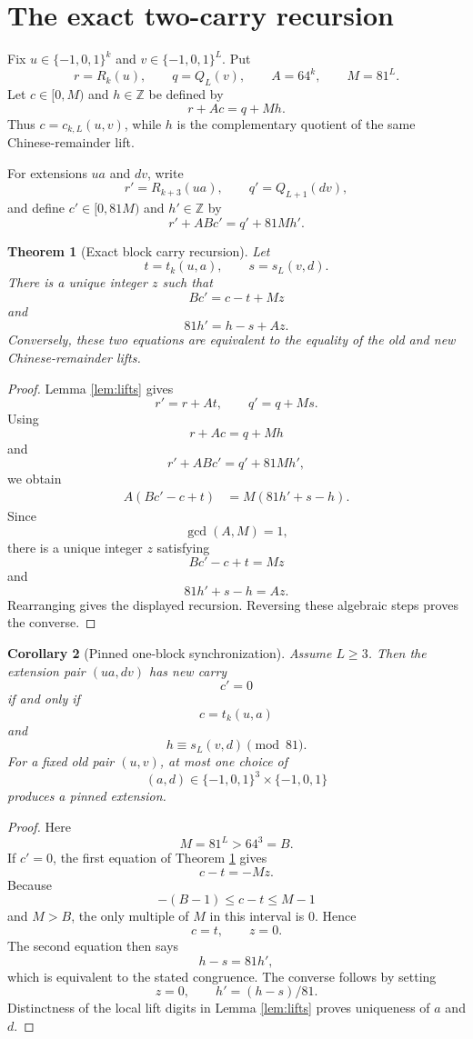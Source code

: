 \documentclass[11pt]{article}
\newtheorem{theorem}{Theorem}[section]
\newtheorem{corollary}[theorem]{Corollary}
\theoremstyle{remark}
\newcommand{\Z}{\mathbb{Z}}
\newcommand{\E}{\{-1,0,1\}}
\begin{document}
\section{The exact two-carry recursion}

Fix $u\in\E^k$ and $v\in\E^L$.  Put
\[
r=R_k(u),
\qquad
q=Q_L(v),
\qquad
A=64^k,
\qquad
M=81^L.
\]
Let $c\in[0,M)$ and $h\in\Z$ be defined by
\[
r+Ac=q+Mh.
\]
Thus $c=c_{k,L}(u,v)$, while $h$ is the complementary quotient of the same Chinese-remainder lift.

For extensions $ua$ and $dv$, write
\[
r'=R_{k+3}(ua),
\qquad
q'=Q_{L+1}(dv),
\]
and define $c'\in[0,81M)$ and $h'\in\Z$ by
\[
r'+ABc'=q'+81Mh'.
\]

\begin{theorem}[Exact block carry recursion]
\label{thm:block-recursion}
Let
\[
t=t_k(u,a),
\qquad
s=s_L(v,d).
\]
There is a unique integer $z$ such that
\[
Bc'=c-t+Mz
\]
and
\[
81h'=h-s+Az.
\]
Conversely, these two equations are equivalent to the equality of the old and new Chinese-remainder lifts.
\end{theorem}

\begin{proof}
Lemma \ref{lem:lifts} gives
\[
r'=r+At,
\qquad
q'=q+Ms.
\]
Using
\[
r+Ac=q+Mh
\]
and
\[
r'+ABc'=q'+81Mh',
\]
we obtain
\begin{align*}
A(Bc'-c+t)
&=M(81h'+s-h).
\end{align*}
Since
\[
\gcd(A,M)=1,
\]
there is a unique integer $z$ satisfying
\[
Bc'-c+t=Mz
\]
and
\[
81h'+s-h=Az.
\]
Rearranging gives the displayed recursion.  Reversing these algebraic steps proves the converse.
\end{proof}

\begin{corollary}[Pinned one-block synchronization]
\label{cor:pinned-sync}
Assume $L\ge3$.  Then the extension pair $(ua,dv)$ has new carry
\[
c'=0
\]
if and only if
\[
c=t_k(u,a)
\]
and
\[
h\equiv s_L(v,d)\pmod{81}.
\]
For a fixed old pair $(u,v)$, at most one choice of
\[
(a,d)\in\E^3\times\E
\]
produces a pinned extension.
\end{corollary}

\begin{proof}
Here
\[
M=81^L>64^3=B.
\]
If $c'=0$, the first equation of Theorem \ref{thm:block-recursion} gives
\[
c-t=-Mz.
\]
Because
\[
-(B-1)\le c-t\le M-1
\]
and $M>B$, the only multiple of $M$ in this interval is $0$.  Hence
\[
c=t,
\qquad
z=0.
\]
The second equation then says
\[
h-s=81h',
\]
which is equivalent to the stated congruence.  The converse follows by setting
\[
z=0,
\qquad
h'=(h-s)/81.
\]
Distinctness of the local lift digits in Lemma \ref{lem:lifts} proves uniqueness of $a$ and $d$.
\end{proof}
\end{document}
